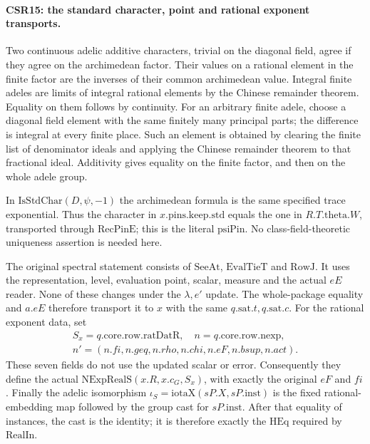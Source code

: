 \paragraph{CSR15: the standard character, point and rational exponent transports.}
\label{claim:CSR15}
Two continuous adelic additive characters, trivial on the
diagonal field, agree if they agree on the archimedean factor.
Their values on a rational element in the finite factor are the
inverses of their common archimedean value. Integral finite
adeles are limits of integral rational elements by the Chinese
remainder theorem. Equality on them follows by continuity.
For an arbitrary finite adele, choose a diagonal field element
with the same finitely many principal parts; the difference is
integral at every finite place. Such an element is obtained by
clearing the finite list of denominator ideals and applying
the Chinese remainder theorem to that fractional ideal.
Additivity gives equality on the finite factor, and then on
the whole adele group.

In \(\mathrm{IsStdChar}(D,\psi,-1)\) the archimedean formula is
the same specified trace exponential. Thus the character in
\(x.\mathrm{pins.keep.std}\) equals the one in
\(R.T.\mathrm{theta}.W\), transported through
\(\mathrm{RecPinE}\); this is the literal \(\mathrm{psiPin}\).
No class-field-theoretic uniqueness assertion is needed here.

The original spectral statement consists of \(\mathrm{SeeAt}\),
\(\mathrm{EvalTieT}\) and \(\mathrm{RowJ}\). It uses the
representation, level, evaluation point, scalar, measure and
the actual \(eE\) reader. None of these changes under the
\(\lambda,e'\) update. The whole-package equality and
\(a.eE\) therefore transport it to \(x\) with the same
\(q.\mathrm{sat}.t,q.\mathrm{sat}.c\).
For the rational exponent data, set
\[
 \begin{gathered}
 S_x=q.\mathrm{core.row}.\mathrm{ratDatR},\quad
 n=q.\mathrm{core.row.nexp},\\
 n'=(n.fi,n.geq,n.rho,n.chi,n.eF,n.bsup,n.act).
 \end{gathered}
 \tag{CSR.33}
\]
These seven fields do not use the updated scalar or error.
Consequently they define the actual
\(\mathrm{NExpRealS}(x.R,x.c_G,S_x)\), with exactly the original
\(eF\) and \(fi\).
Finally the adelic isomorphism
\(\iota_S=\mathrm{iotaX}(sP.X,sP.\mathrm{inst})\)
is the fixed rational-embedding map followed by the group cast
for \(sP.\mathrm{inst}\). After that equality of instances,
the cast is the identity; it is therefore exactly the
\(\mathrm{HEq}\) required by \(\mathrm{RealIn}\).

